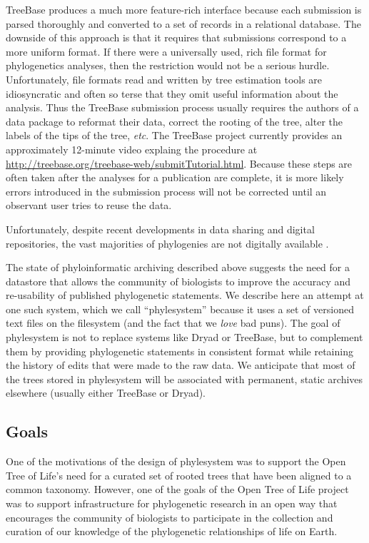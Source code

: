 \documentclass[a4paper,10pt]{article}
\newcommand{\ps}{phylesystem\xspace}
\newcommand{\otol}{Open Tree of Life\xspace}
\begin{document}
TreeBase produces a much more feature-rich interface because each submission is parsed thoroughly and converted 
    to a set of records in a relational database.
The downside of this approach is that it requires that submissions correspond to a more uniform format.
If there were a universally used, rich file format for phylogenetics analyses, then the restriction would not be a
    serious hurdle.
Unfortunately, file formats read and written by tree estimation tools are idiosyncratic and often so 
    terse that they omit useful information about the analysis.
Thus the TreeBase submission process usually requires the authors of a data package to reformat their data, correct
    the rooting of the tree, alter the labels of the tips of the tree, {\em etc}.
The TreeBase project currently provides an approximately 12-minute video explaing the procedure at 
    \url{http://treebase.org/treebase-web/submitTutorial.html}.
Because these steps are often taken after the analyses for a publication are complete, it is more likely 
    errors introduced in the submission process will not be corrected until an observant user tries to reuse the data.

Unfortunately, despite recent developments in data sharing and digital repositories,
    the vast majorities of phylogenies are not digitally available \cite{Drew}.

The state of phyloinformatic archiving described above suggests the need for a datastore that allows the 
    community of biologists to improve the accuracy and re-usability of published phylogenetic statements.
We describe here an attempt at one such system, which we call ``phylesystem'' because it uses a set of
    versioned text files on the filesystem (and the fact that we {\em love} bad puns).
The goal of \ps is not to replace systems like Dryad or TreeBase, but to complement them by 
    providing phylogenetic statements in consistent format while retaining the history of
    edits that were made to the raw data.
We anticipate that most of the trees stored in \ps will be associated with permanent, static archives
    elsewhere (usually either TreeBase or Dryad).

\subsection{Goals}
One of the motivations of the design of \ps was to support the \otol's need for a curated set
    of rooted trees that have been aligned to a common taxonomy.
However, one of the goals of the \otol project was to support infrastructure for phylogenetic
    research in an open way that encourages the community of biologists to participate in the 
    collection and curation of our knowledge of the phylogenetic relationships of life on Earth.
\end{document}
